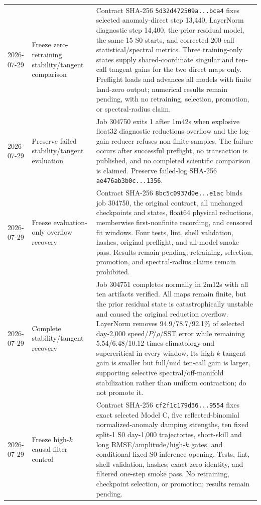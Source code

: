 \documentclass[11pt]{article}
\begin{document}
\begin{longtable}{@{}p{}p{}p{}@{}}
2026-07-29 & Freeze zero-retraining stability/tangent comparison & Contract SHA-256 \texttt{5d32d472509a...bca4} fixes selected anomaly-direct step 13,440, LayerNorm diagnostic step 14,400, the prior residual model, the same 15 S0 starts, and corrected 200-call statistical/spectral metrics.  Three training-only states supply shared-coordinate singular and ten-call tangent gains for the two direct maps only.  Preflight loads and advances all models with finite land-zero output; numerical results remain pending, with no retraining, selection, promotion, or spectral-radius claim. \\
2026-07-29 & Preserve failed stability/tangent evaluation & Job 304750 exits 1 after 1m42s when explosive float32 diagnostic reductions overflow and the log-gain reducer refuses non-finite samples.  The failure occurs after successful preflight, no transaction is published, and no completed scientific comparison is claimed.  Preserve failed-log SHA-256 \texttt{ae476ab3b0c...1356}. \\
2026-07-29 & Freeze evaluation-only overflow recovery & Contract SHA-256 \texttt{8bc5c0937d0e...e1ac} binds job 304750, the original contract, all unchanged checkpoints and states, float64 physical reductions, memberwise first-nonfinite recording, and censored fit windows.  Four tests, lint, shell validation, hashes, original preflight, and all-model smoke pass.  Results remain pending; retraining, selection, promotion, and spectral-radius claims remain prohibited. \\
2026-07-29 & Complete stability/tangent recovery & Job 304751 completes normally in 2m12s with all ten artifacts verified.  All maps remain finite, but the prior residual state is catastrophically unstable and caused the original reduction overflow.  LayerNorm removes 94.9/78.7/92.1\% of selected day-2,000 speed/\(P/\rho\)/SST error while remaining 5.54/6.48/10.12 times climatology and supercritical in every window.  Its high-\(k\) tangent gain is smaller but full/mid ten-call gain is larger, supporting selective spectral/off-manifold stabilization rather than uniform contraction; do not promote it. \\
2026-07-29 & Freeze high-\(k\) causal filter control & Contract SHA-256 \texttt{cf2f1c179d36...9554} fixes exact selected Model C, five reflected-binomial normalized-anomaly damping strengths, ten fixed split-1 S0 day-1,000 trajectories, short-skill and long RMSE/amplitude/high-\(k\) gates, and conditional fixed S0 inference opening.  Tests, lint, shell validation, hashes, exact zero identity, and filtered one-step smoke pass.  No retraining, checkpoint selection, or promotion; results remain pending. \\

\end{longtable}
\end{document}
